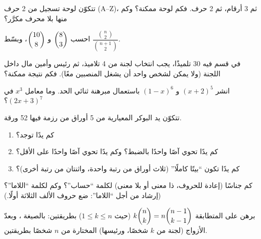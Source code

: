\begin{exercise}[$\star$]\label{exo:g12:comb:1}
تتكوّن لوحة تسجيل من 2 حرف (A--Z)، ثم 3 أرقام، ثم 2 حرف.
فكم لوحة ممكنة؟ وكم منها بلا محرف مكرَّر؟
\end{exercise}

\begin{exercise}[$\star$]\label{exo:g12:comb:2}
احسب $\dbinom{8}{3}$ و $\dbinom{10}{8}$، وبسّط
$\dfrac{\binom{n}{2}}{\binom{n+1}{2}}$.
\end{exercise}

\begin{exercise}[$\star$]\label{exo:g12:comb:3}
في قسم فيه 30 تلميذًا، يجب انتخاب لجنة من 4 تلاميذ، ثم
رئيس وأمين مال داخل اللجنة (ولا يمكن لشخص واحد أن يشغل المنصبين
معًا). فكم نتيجة ممكنة؟
\end{exercise}

\begin{exercise}[$\star$]\label{exo:g12:comb:4}
انشر $(x + 2)^5$ و $(1 - x)^6$ باستعمال مبرهنة ثنائي الحد. وما
معامل $x^3$ في $(2x + 3)^7$؟
\end{exercise}

\begin{exercise}[$\star\star$]\label{exo:g12:comb:5}
تتكوّن يد البوكر المعيارية من 5 أوراق من رزمة فيها 52 ورقة.
\begin{enumerate}
  \item كم يدًا توجد؟
  \item كم يدًا تحوي آصًا واحدًا بالضبط؟ وكم يدًا تحوي آصًا واحدًا على الأقل؟
  \item كم يدًا تكون ``بيتًا كاملًا'' (ثلاث أوراق من رتبة واحدة، واثنتان من
        رتبة أخرى)؟
\end{enumerate}
\end{exercise}

\begin{exercise}[$\star\star$]\label{exo:g12:comb:6}
كم جناسًا (إعادة  للحروف، ذا معنى أو بلا معنى) لكلمة
``حساب''؟ وكم لكلمة ``اللاما''؟
(إرشاد من أجل ``اللاما'': ضع حروف الألف الثلاثة أولًا.)
\end{exercise}

\begin{exercise}[$\star\star$]\label{exo:g12:comb:7}
برهن على المتطابقة $k\dbinom{n}{k} = n\dbinom{n-1}{k-1}$ (حيث $1 \leq k \leq n$)
بطريقتين: بالصيغة ، وبعدّ الأزواج
(لجنة من $k$ شخصًا، ورئيسها) المختارة من $n$ شخصًا بطريقتين.
\end{exercise}


